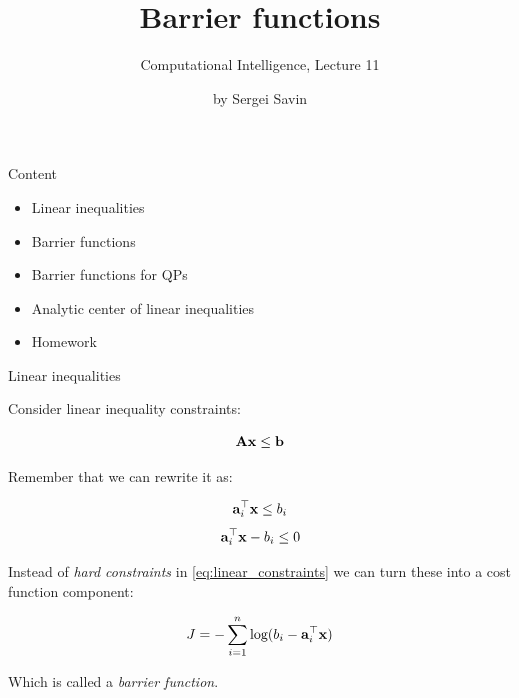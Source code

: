 \documentclass{beamer}
\title{Barrier functions}
\subtitle{Computational Intelligence, Lecture 11}
\author{by Sergei Savin}
\date{\mydate}
\begin{document}
\maketitle


\begin{frame}{Content}

\begin{itemize}
\item Linear inequalities
\item Barrier functions
\item Barrier functions for QPs
\item Analytic center of linear inequalities
\item Homework
\end{itemize}

\end{frame}



\begin{frame}{Linear inequalities}
\begin{flushleft}

Consider linear inequality constraints:

\begin{equation}
    \mathbf{A}\mathbf{x} \leq \mathbf{b}
\end{equation}

Remember that we can rewrite it as:

\begin{equation}
    \mathbf{a}_i^\top \mathbf{x} \leq b_i
\end{equation}
\begin{equation}
\label{eq:linear_constraints}
    \mathbf{a}_i^\top \mathbf{x} - b_i \leq 0
\end{equation}

Instead of \emph{hard constraints} in \eqref{eq:linear_constraints} we can turn these into a cost function component:

\begin{equation}
    J = -\sum\limits_{i = 1}^n \text{log} (b_i - \mathbf{a}_i^\top \mathbf{x})
\end{equation}

Which is called a \emph{barrier function}.
 
\end{flushleft}
\end{frame}
\end{document}
